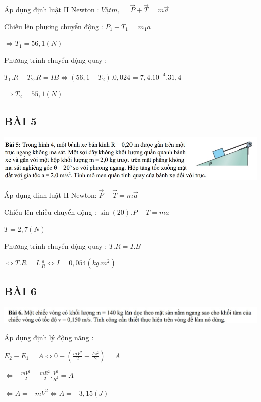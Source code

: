 \documentclass[12pt,a4paper]{article}
\begin{document}
\vspace*{1cm}
Áp dụng định luật II Newton :  $Vật m_1 =  \vec{P} + \vec{T} = m\vec{a}$

\vspace*{1cm} Chiếu lên phương chuyển động : $P_1 - T_1 = m_1a$

\vspace*{1cm}
$\Rightarrow T_1 = 56,1 (N) $

\vspace*{1cm}
Phương trình chuyển động quay :

\vspace*{1cm}
$T_1.R - T_2.R = IB \Leftrightarrow (56,1 - T_2).0,024 = 7,4.10^{-4} .31,4$

\vspace*{1cm}
$\Rightarrow T_2 = 55,1 (N)$

\vspace*{1cm}
\Large \subsection{\color{blue}\textbf{BÀI 5} }
\includegraphics[scale=0.80]{No4_5.jpg}

\vspace*{1cm}
Áp dụng định luật II Newton: $ \vec{P} + \vec{T} = m\vec{a}$

\vspace*{1cm}
Chiếu lên chiều chuyển động : $\sin(20).P - T = ma$

\vspace*{1cm}
$ T = 2,7 (N)$

\vspace*{1cm}
Phương trình chuyển động quay : $ T.R = I.B$

\vspace*{1cm}
$\Leftrightarrow T.R = I. \frac{a}{R} \Leftrightarrow I = 0,054 (kg.m^2)$
\vspace*{1cm}
\Large \subsection{\color{blue}\textbf{BÀI 6} }
\includegraphics[scale=0.80]{No4_6.jpg}

\vspace*{1cm}
Áp dụng định lý động năng :

\vspace*{1cm}
$ E_2 - E_1 = A \Leftrightarrow 0 - (\frac{mV^2}{2} + \frac{I\omega^2}{2}) = A$

\vspace*{1cm}
$\Leftrightarrow -\frac{mV^2}{2} - \frac{mR^2}{2} . \frac{V^2}{R^2} = A$

\vspace*{1cm}
$\Leftrightarrow A = - mV^2 \Leftrightarrow A = -3,15 (J)$
\end{document}
